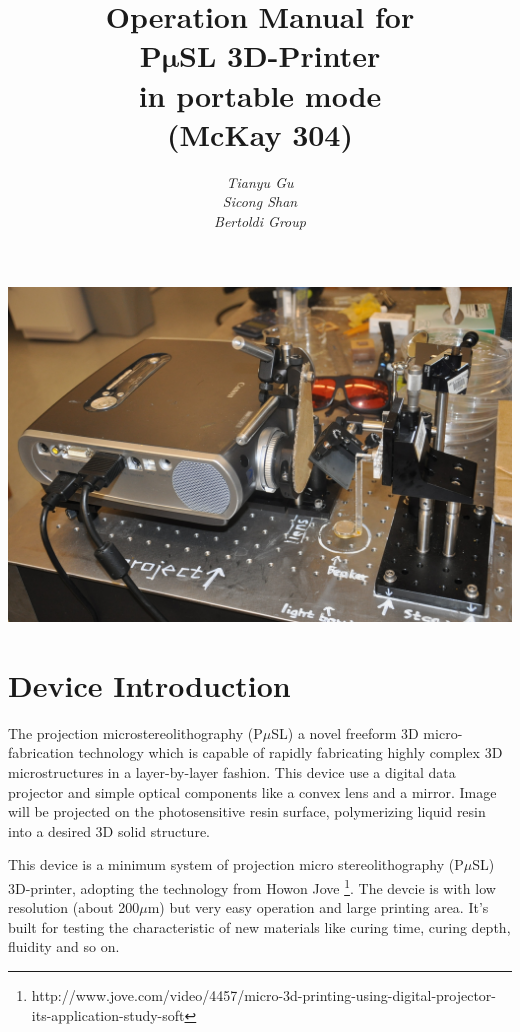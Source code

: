 \documentclass[a4paper]{article}
\title{\textbf{ 
        \Large {Operation Manual for} \\ 
         \vspace {10pt}
          \Huge {P$\bm{\mu}$SL 3D-Printer } \\
           \vspace {10pt}
           	\LARGE {in portable mode}	\\
             \vspace {10pt}
              \Large{(McKay 304)}
               \vspace {20pt}
              }}
\author{\textit{Tianyu Gu} \\
				\textit{Sicong Shan} \\
				\textit{Bertoldi Group}}
\begin{document}
	\maketitle
	 \vspace{50pt}

	\centering
	 \includegraphics[width=400pt]{frontpic.jpg}
	\clearpage

	\tableofcontents 
	\clearpage

	\raggedright

	\section{Device Introduction}\label{sec:device-introduction}
		The projection microstereolithography (P$\mu$SL) a novel freeform 3D micro-fabrication technology 
		which is capable of rapidly fabricating highly complex 3D microstructures in a layer-by-layer fashion. 
		This device use a digital data projector and simple optical components like a convex lens and a mirror. 
		Image will be projected on the photosensitive resin surface, polymerizing liquid resin into a desired 
		3D solid structure. \\ 
		\vspace{10pt}

		This device is a minimum system of projection micro stereolithography (P$\mu$SL) 3D-printer, adopting the
		technology from Howon Jove \footnote{http://www.jove.com/video/4457/micro-3d-printing-using-digital-projector-its-application-study-soft}.
		The devcie is with low resolution (about 200$\mu$m) but very easy operation and large printing area. 
		It's built for testing the characteristic of new materials like curing time, curing depth, fluidity and so on. \\
		\vspace{10pt}
\end{document}
